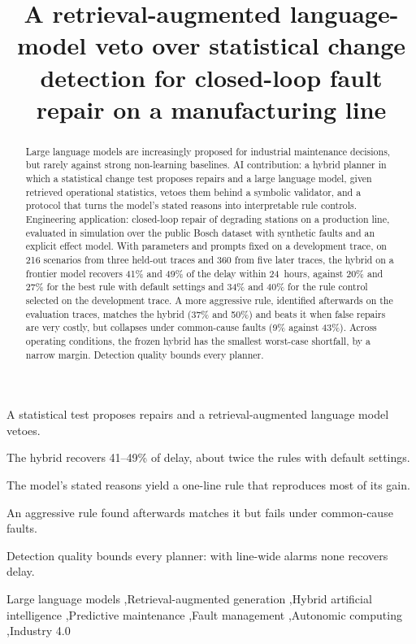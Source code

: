\documentclass[preprint,11pt]{elsarticle}
\begin{document}
\begin{frontmatter}

\title{A retrieval-augmented language-model veto over statistical change detection for closed-loop fault repair on a manufacturing line}


\begin{abstract}
Large language models are increasingly proposed for industrial maintenance decisions, but rarely against strong non-learning baselines. AI contribution: a hybrid planner in which a statistical change test proposes repairs and a large language model, given retrieved operational statistics, vetoes them behind a symbolic validator, and a protocol that turns the model's stated reasons into interpretable rule controls. Engineering application: closed-loop repair of degrading stations on a production line, evaluated in simulation over the public Bosch dataset with synthetic faults and an explicit effect model. With parameters and prompts fixed on a development trace, on 216 scenarios from three held-out traces and 360 from five later traces, the hybrid on a frontier model recovers 41\% and 49\% of the delay within 24~hours, against 20\% and 27\% for the best rule with default settings and 34\% and 40\% for the rule control selected on the development trace. A more aggressive rule, identified afterwards on the evaluation traces, matches the hybrid (37\% and 50\%) and beats it when false repairs are very costly, but collapses under common-cause faults (9\% against 43\%). Across operating conditions, the frozen hybrid has the smallest worst-case shortfall, by a narrow margin. Detection quality bounds every planner.
\end{abstract}

\begin{highlights}
\item A statistical test proposes repairs and a retrieval-augmented language model vetoes.
\item The hybrid recovers 41--49\% of delay, about twice the rules with default settings.
\item The model's stated reasons yield a one-line rule that reproduces most of its gain.
\item An aggressive rule found afterwards matches it but fails under common-cause faults.
\item Detection quality bounds every planner: with line-wide alarms none recovers delay.
\end{highlights}

\begin{keyword}
Large language models \sep Retrieval-augmented generation \sep Hybrid artificial intelligence \sep Predictive maintenance \sep Fault management \sep Autonomic computing \sep Industry 4.0
\end{keyword}

\end{frontmatter}
\end{document}
